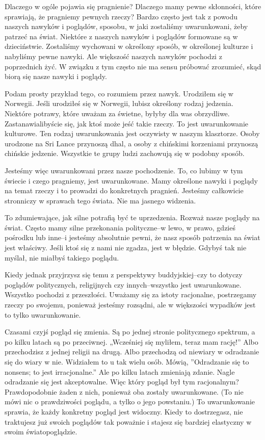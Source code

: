 \documentclass[12pt,openany]{book}
\begin{document}
Dlaczego w ogóle pojawia się pragnienie? Dlaczego mamy pewne skłonności, które sprawiają, że pragniemy pewnych rzeczy? Bardzo często jest tak z powodu naszych nawyków i poglądów, sposobu, w jaki zostaliśmy uwarunkowani, żeby patrzeć na świat. Niektóre z naszych nawyków i poglądów formowane są w dzieciństwie. Zostaliśmy wychowani w określony sposób, w określonej kulturze i nabyliśmy pewne nawyki. Ale większość naszych nawyków pochodzi z poprzednich żyć. W związku z tym często nie ma sensu próbować zrozumieć, skąd biorą się nasze nawyki i poglądy.

Podam prosty przykład tego, co rozumiem przez nawyk. Urodziłem się w Norwegii. Jeśli urodziłeś się w Norwegii, lubisz określony rodzaj jedzenia. Niektóre potrawy, które uważam za świetne, byłyby dla was obrzydliwe. Zastanawialibyście się, jak ktoś może jeść takie rzeczy. To jest uwarunkowanie kulturowe. Ten rodzaj uwarunkowania jest oczywisty w naszym klasztorze. Osoby urodzone na Sri Lance przynoszą dhal, a osoby z chińskimi korzeniami przynoszą chińskie jedzenie. Wszystkie te grupy ludzi zachowują się w podobny sposób.

Jesteśmy więc uwarunkowani przez nasze pochodzenie. To, co lubimy w tym świecie i czego pragniemy, jest uwarunkowane. Mamy określone nawyki i poglądy na temat rzeczy i to prowadzi do konkretnych pragnień. Jesteśmy całkowicie stronniczy w sprawach tego świata. Nie ma jasnego widzenia.

To zdumiewające, jak silne potrafią być te uprzedzenia. Rozważ nasze poglądy na świat. Często mamy silne przekonania polityczne–w lewo, w prawo, gdzieś pośrodku lub inne–i jesteśmy absolutnie pewni, że nasz sposób patrzenia na świat jest właściwy. Jeśli ktoś się z nami nie zgadza, jest w błędzie. Gdybyś tak nie myślał, nie miałbyś takiego poglądu.

Kiedy jednak przyjrzysz się temu z perspektywy buddyjskiej–czy to dotyczy poglądów politycznych, religijnych czy innych–wszystko jest uwarunkowane. Wszystko pochodzi z przeszłości. Uważamy się za istoty racjonalne, postrzegamy rzeczy po swojemu, ponieważ jesteśmy rozsądni, ale w większości wypadków jest to tylko uwarunkowanie.

Czasami czyjś pogląd się zmienia. Są po jednej stronie politycznego spektrum, a po kilku latach są po przeciwnej. „Wcześniej się myliłem, teraz mam rację!” Albo przechodzisz z jednej religii na drugą. Albo przechodzą od niewiary w odradzanie się do wiary w nie. Widziałem to u tak wielu osób. Mówią, ”Odradzanie się to nonsens; to jest irracjonalne.” Ale po kilku latach zmieniają zdanie. Nagle odradzanie się jest akceptowalne. Więc który pogląd był tym racjonalnym? Prawdopodobnie żaden z nich, ponieważ oba zostały uwarunkowane. (To nie mówi nic o prawdziwości poglądu, a tylko o jego powstaniu.) To uwarunkowanie sprawia, że każdy konkretny pogląd jest widoczny. Kiedy to dostrzegasz, nie traktujesz już swoich poglądów tak poważnie i stajesz się bardziej elastyczny w swoim światopoglądzie.
\end{document}
